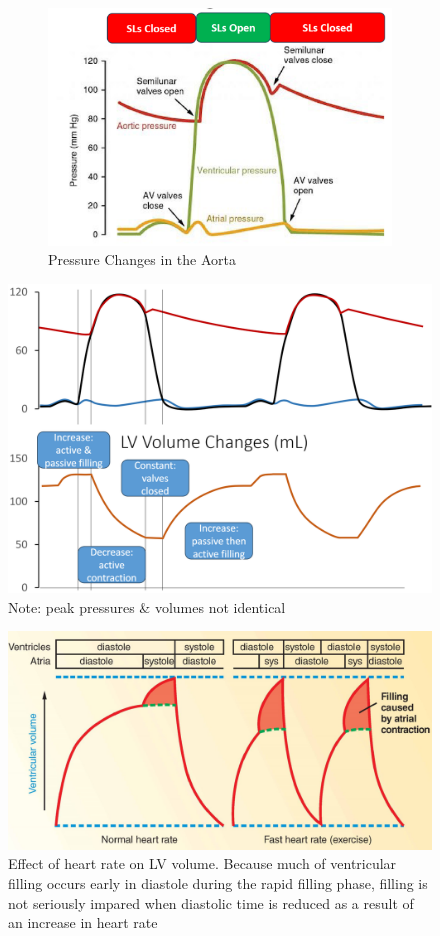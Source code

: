 \documentclass[11pt,fleqn]{book}
\begin{document}
\begin{figure}[h!]
\begin{subfigure}{0.45\textwidth}
        \includegraphics[width=\textwidth]{Pictures/Screenshot 2024-04-04 003437.png}
        \caption{Pressure Changes in the Aorta}
    \end{subfigure}
    \caption{}
\end{figure}

\begin{figure}[h!]
\begin{center}
    \includegraphics[width=0.6\linewidth]{Pictures/Screenshot 2024-04-04 004121.png}
    \caption{Note: peak
pressures \&
volumes not
identical
}
\end{center}
\end{figure}

\begin{figure}[h!]
\begin{center}
    \includegraphics[width=0.6\linewidth]{Pictures/Screenshot 2024-04-04 004240.png}
    \caption{Effect of heart rate on LV volume. Because much of ventricular filling occurs early in diastole during the rapid filling phase, filling is not seriously impared when diastolic time is reduced as a result of an increase in heart rate}
\end{center}
\end{figure}
\end{document}
